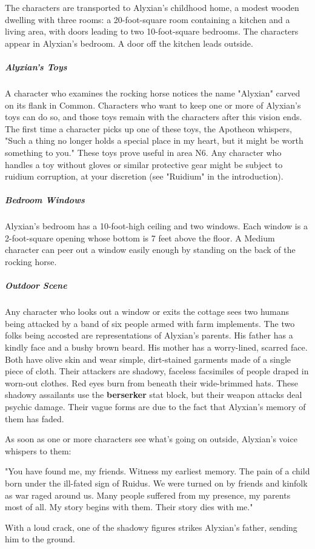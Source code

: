 \documentclass[10pt,a4paper,twoside,fancy,bg=print,twocolumn,openany,nodeprecatedcode]{dndbook}
\begin{document}
The characters are transported to Alyxian's childhood home, a modest wooden dwelling with three rooms: a 20-foot-square room containing a kitchen and a living area, with doors leading to two 10-foot-square bedrooms. The characters appear in Alyxian's bedroom. A door off the kitchen leads outside.

\subparagraph{Alyxian's Toys}
A character who examines the rocking horse notices the name "Alyxian" carved on its flank in Common. Characters who want to keep one or more of Alyxian's toys can do so, and those toys remain with the characters after this vision ends. The first time a character picks up one of these toys, the Apotheon whispers, "Such a thing no longer holds a special place in my heart, but it might be worth something to you." These toys prove useful in area N6. Any character who handles a toy without gloves or similar protective gear might be subject to ruidium corruption, at your discretion (see "Ruidium" in the introduction).

\subparagraph{Bedroom Windows}
Alyxian's bedroom has a 10-foot-high ceiling and two windows. Each window is a 2-foot-square opening whose bottom is 7 feet above the floor. A Medium character can peer out a window easily enough by standing on the back of the rocking horse.

\subparagraph{Outdoor Scene}
Any character who looks out a window or exits the cottage sees two humans being attacked by a band of six people armed with farm implements. The two folks being accosted are representations of Alyxian's parents. His father has a kindly face and a bushy brown beard. His mother has a worry-lined, scarred face. Both have olive skin and wear simple, dirt-stained garments made of a single piece of cloth. Their attackers are shadowy, faceless facsimiles of people draped in worn-out clothes. Red eyes burn from beneath their wide-brimmed hats. These shadowy assailants use the \textbf{berserker} stat block, but their weapon attacks deal psychic damage. Their vague forms are due to the fact that Alyxian's memory of them has faded.

As soon as one or more characters see what's going on outside, Alyxian's voice whispers to them:

\begin{DndReadAloud}{}
"You have found me, my friends. Witness my earliest memory. The pain of a child born under the ill-fated sign of Ruidus. We were turned on by friends and kinfolk as war raged around us. Many people suffered from my presence, my parents most of all. My story begins with them. Their story dies with me."

With a loud crack, one of the shadowy figures strikes Alyxian's father, sending him to the ground.

\end{DndReadAloud}
\end{document}
